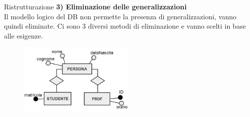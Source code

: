 %
\begin{frame}{Ristrutturazione}
\textbf{3) Eliminazione delle generalizzazioni}
\\\vspace{2em}
Il modello logico del DB non permette la presenza di generalizzazioni, vanno quindi eliminate. Ci sono 3 diversi metodi di eliminazione e vanno scelti in base alle esigenze.
\begin{figure}[h]
        \centering
        \includegraphics[width=0.5\textwidth]{img/i6.png}
    \end{figure}
\end{frame}
%
